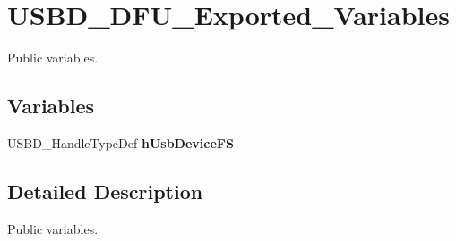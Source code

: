 \hypertarget{group__USBD__DFU__Exported__Variables}{}\section{U\+S\+B\+D\+\_\+\+D\+F\+U\+\_\+\+Exported\+\_\+\+Variables}
\label{group__USBD__DFU__Exported__Variables}


Public variables.  


\subsection*{Variables}
\begin{DoxyCompactItemize}
\item 
\mbox{\label{group__USBD__DFU__Exported__Variables_gafe8a2d9e10b33d5e7906f9f04f95358e}} 
U\+S\+B\+D\+\_\+\+Handle\+Type\+Def {\bfseries h\+Usb\+Device\+FS}
\end{DoxyCompactItemize}


\subsection{Detailed Description}
Public variables. 

